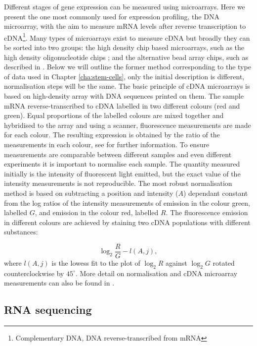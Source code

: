 Different stages of gene expression can be measured using microarrays. Here we present the one most commonly used for expression profiling, the DNA microarray, with the aim  to measure mRNA levels after reverse transcription to cDNA\footnote{Complementary DNA, DNA reverse-transcribed from mRNA}. Many types of microarrays exist to measure cDNA but broadly they can be sorted into two groups: the high density chip based microarrays, such as the high density oligonucleotide chips \citep{Lockhart:1996jw}; and the alternative bead array chips, such as described in \citep{Kuhn:2004gf}. Below we will outline the former method corresponding to the type of data used in Chapter \ref{cha:stem-cells}, only the initial description is different, normalisation steps will be the same. The basic principle of cDNA microarrays is based on high-density array with DNA sequences printed on them. The sample mRNA reverse-transcribed to cDNA labelled in two different colours (red and green). Equal proportions of the labelled colours are mixed together and hybridised to the array and using a scanner, fluorescence measurements are made for each colour. The resulting expression is obtained by the ratio of the measurements in each colour, see \cite{phimister1999chipping} for further information. To ensure measurements are comparable between different samples and even different experiments it is important to normalise each sample. The quantity measured initially is the intensity of fluorescent light emitted, but the exact value of the intensity measurements is not reproducible. The most robust normalisation method is based on subtracting a position and intensity ($A$) dependant constant from the log ratios of the intensity measurements of emission in the colour green, labelled $G$, and emission in the colour red, labelled $R$. The fluorescence emission in different colours are achieved by staining two cDNA populations with different substances:

\begin{equation}
  \label{eq:microarray-norm}
  \log_2 \frac{R}{G} - l(A, j),
\end{equation}
where $l(A, j)$ is the lowess fit \citep{Cleveland:2012fu} to the plot of $\log_2 R$ against $\log_2 G$ rotated counterclockwise by $45^{\circ}$. More detail on normalisation and cDNA microarray measurements can also be found in \cite{Dudoit:2002va}.

\subsection{RNA sequencing}
\label{sec:rna-sequencing}

